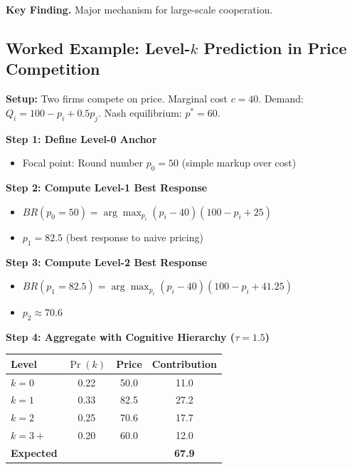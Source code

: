 \textbf{Key Finding.}
Major mechanism for large-scale cooperation.

\subsection{Worked Example: Level-$k$ Prediction in Price Competition}
\label{sec:ad-worked-example}


\begin{tcolorbox}[colback=orange!5!white, colframe=orange!75!black,
    title=\textbf{Worked Example: Bertrand Competition with Bounded Rationality}]

\textbf{Setup:} Two firms compete on price. Marginal cost $c = 40$.
Demand: $Q_i = 100 - p_i + 0.5 p_j$. Nash equilibrium: $p^* = 60$.

\textbf{Step 1: Define Level-0 Anchor}
\begin{itemize}[nosep]
    \item Focal point: Round number $p_0 = 50$ (simple markup over cost)
\end{itemize}

\textbf{Step 2: Compute Level-1 Best Response}
\begin{itemize}[nosep]
    \item $BR(p_0 = 50) = \arg\max_{p_i} (p_i - 40)(100 - p_i + 25)$
    \item $p_1 = 82.5$ (best response to naive pricing)
\end{itemize}

\textbf{Step 3: Compute Level-2 Best Response}
\begin{itemize}[nosep]
    \item $BR(p_1 = 82.5) = \arg\max_{p_i} (p_i - 40)(100 - p_i + 41.25)$
    \item $p_2 \approx 70.6$
\end{itemize}

\textbf{Step 4: Aggregate with Cognitive Hierarchy ($\tau = 1.5$)}

\begin{center}
\renewcommand{\arraystretch}{1.2}
\begin{tabular}{@{}lccc@{}}
\toprule
Level & $\Pr(k)$ & Price & Contribution \\
\midrule
$k=0$ & 0.22 & 50.0 & 11.0 \\
$k=1$ & 0.33 & 82.5 & 27.2 \\
$k=2$ & 0.25 & 70.6 & 17.7 \\
$k=3+$ & 0.20 & 60.0 & 12.0 \\
\midrule
\textbf{Expected} & & & \textbf{67.9} \\
\bottomrule
\end{tabular}
\end{center}


\end{tcolorbox}
